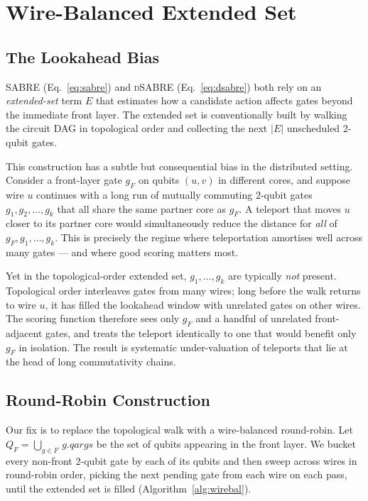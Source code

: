 \documentclass[conference]{IEEEtran}
\newcommand{\dSABRE}{\textsc{dSABRE}}
\newcommand{\SABRE}{\textsc{SABRE}}
\begin{document}
\section{Wire-Balanced Extended Set}
\label{sec:burstext}

\subsection{The Lookahead Bias}

\SABRE{} (Eq.~\ref{eq:sabre}) and \dSABRE{} (Eq.~\ref{eq:dsabre}) both rely
on an \emph{extended-set} term $E$ that estimates how a candidate action
affects gates beyond the immediate front layer.
The extended set is conventionally built by walking the circuit DAG in
topological order and collecting the next $|E|$ unscheduled 2-qubit gates.

This construction has a subtle but consequential bias in the distributed
setting.
Consider a front-layer gate $g_F$ on qubits $(u,v)$ in different cores, and
suppose wire $u$ continues with a long run of mutually commuting 2-qubit
gates $g_1, g_2, \ldots, g_k$ that all share the same partner core as $g_F$.
A teleport that moves $u$ closer to its partner core would simultaneously
reduce the distance for \emph{all} of $g_F, g_1, \ldots, g_k$.
This is precisely the regime where teleportation amortises well across many
gates --- and where good scoring matters most.

Yet in the topological-order extended set, $g_1, \ldots, g_k$ are typically
\emph{not} present.
Topological order interleaves gates from many wires; long before the walk
returns to wire $u$, it has filled the lookahead window with unrelated gates
on other wires.
The scoring function therefore sees only $g_F$ and a handful of unrelated
front-adjacent gates, and treats the teleport identically to one that would
benefit only $g_F$ in isolation.
The result is systematic under-valuation of teleports that lie at the head
of long commutativity chains.

\subsection{Round-Robin Construction}

Our fix is to replace the topological walk with a wire-balanced round-robin.
Let $Q_F = \bigcup_{g\in F}\,g.\mathit{qargs}$ be the set of qubits appearing
in the front layer.
We bucket every non-front 2-qubit gate by each of its qubits and then sweep
across wires in round-robin order, picking the next pending gate from each
wire on each pass, until the extended set is filled
(Algorithm~\ref{alg:wirebal}).
\end{document}
